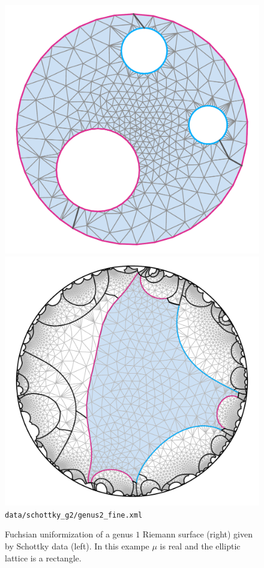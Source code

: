 \documentclass[Thesis.tex]{subfiles}
\begin{document}
\begin{figure} 
\centering
\includegraphics[width=0.45\linewidth]{data/schottky_g2/genus2_fine_image2}
\includegraphics[width=0.45\linewidth]{data/schottky_g2/genus2_fine_domain2}
{\scriptsize\tt data/schottky\_g2/genus2\_fine.xml} 
\caption{Fuchsian uniformization of a genus $1$ Riemann surface (right) given
by Schottky data (left). In this exampe $\mu$ is real and the elliptic lattice
is a rectangle.} 
\label{fig:fuchsian_to_schottky_genus2} 
\end{figure}
\end{document}

